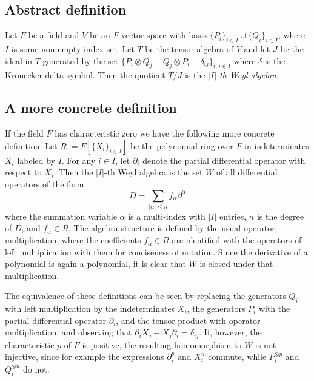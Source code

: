 \documentclass[12pt]{article}
\newcommand{\<}{\langle}
\renewcommand{\>}{\rangle}
\newcommand{\Sum}{\sum\limits}
\begin{document}
\subsection*{Abstract definition}

Let $F$ be a field and $V$ be an $F$-vector space with basis
$\{P_i\}_{i\in I}\cup\{Q_i\}_{i\in I}$, where $I$ is some non-empty
index set. Let $T$ be the tensor algebra of $V$ and let
$J$ be the ideal in $T$ generated by the set
$\{P_i\otimes Q_j-Q_j\otimes P_i-\delta_{ij}\}_{i,j\in I}$ where
$\delta$ is the Kronecker delta symbol. Then the quotient $T/J$ is the
\emph{$|I|$-th Weyl algebra}.

\subsection*{A more concrete definition}

If the field $F$ has characteristic zero we have the following more
concrete definition. Let $R:=F[\{X_i\}_{i\in I}]$ be the polynomial
ring over $F$ in indeterminates $X_i$ labeled by $I$. For any $i\in
I$, let $\partial_i$ denote the partial differential operator with
respect to $X_i$. Then the $|I|$-th Weyl algebra is the set $W$ of all
differential operators of the form
\begin{equation*}
D=\Sum_{|\alpha|\leq n}f_\alpha\partial^\alpha
\end{equation*}
where the summation variable $\alpha$ is a multi-index with $|I|$
entries, $n$ is the degree of $D$, and $f_\alpha\in R$. The algebra
structure is defined by the usual operator multiplication, where the
coefficients $f_\alpha\in R$ are identified with the operators of left
multiplication with them for conciseness of notation. Since the
derivative of a polynomial is again a polynomial, it is clear that $W$
is closed under that multiplication.

The equivalence of these definitions can be seen by replacing the
generators $Q_i$ with left multiplication by the indeterminates $X_i$,
the generators $P_i$ with the partial differential operator
$\partial_i$, and the tensor product with operator multiplication, and
observing that $\partial_iX_j-X_j\partial_i=\delta_{ij}$. If, however,
the characteristic $p$ of $F$ is positive, the resulting homomorphism
to $W$ is not injective, since for example the expressions
$\partial_i^p$ and $X_i^n$ commute, while $P_i^{\otimes p}$ and
$Q_i^{\otimes n}$ do not.
\end{document}
